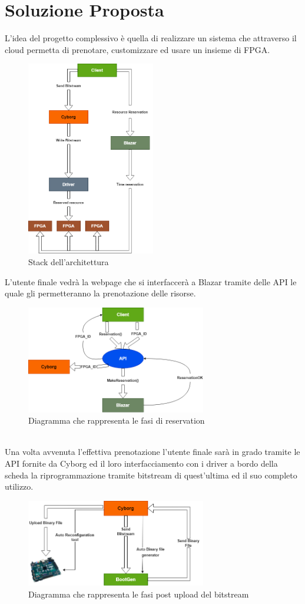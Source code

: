 \chapter{Soluzione Proposta}
\label{chap:Cap1}
L'idea del progetto complessivo è quella di realizzare un sistema che attraverso il cloud permetta di prenotare, customizzare ed usare un insieme di FPGA.
\begin{figure}[h]
\centering
\includegraphics[width=0.5\textwidth]{images/Stack1.png}
\caption{Stack dell'architettura}
\end{figure}\clearpage
L'utente finale vedrà la webpage che si interfaccerà a Blazar tramite delle API le quale gli permetteranno la prenotazione delle risorse.
\begin{figure}[h]
\centering
\includegraphics[width=0.7\textwidth]{images/Arch1.png}
\caption{Diagramma che rappresenta le fasi di reservation}
\end{figure}\\
Una volta avvenuta l'effettiva prenotazione l'utente finale sarà in grado tramite le API fornite da Cyborg ed il loro interfacciamento con i driver a bordo della scheda la riprogrammazione tramite bitstream di quest'ultima ed il suo completo utilizzo. 
\begin{figure}[h]
\centering
\includegraphics[width=0.7\textwidth]{images/Arch.png}
\caption{Diagramma che rappresenta le fasi post upload del bitstream}
\end{figure}\\
